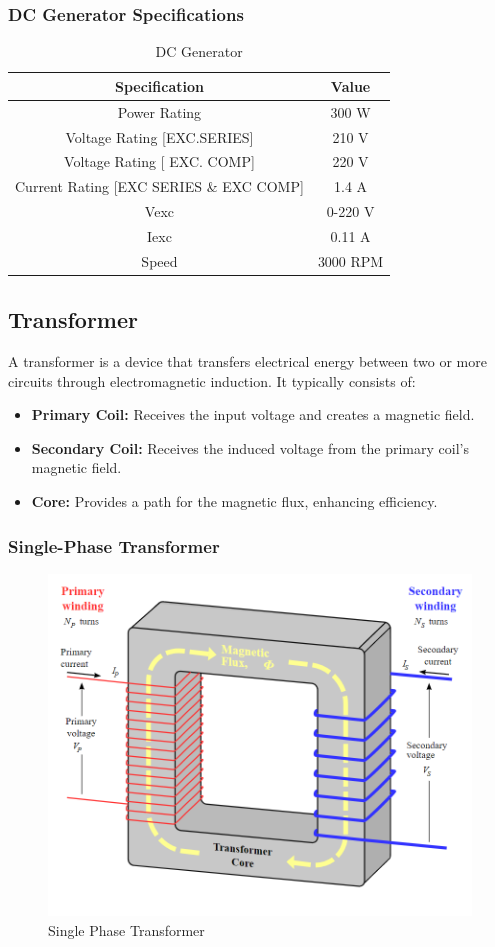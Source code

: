 \documentclass[a4paper,12pt]{article}
\begin{document}
	\subsubsection{DC Generator Specifications}
	\begin{table}[H]
		\centering
			\caption{DC Generator}
		\begin{tabular}{| c | c |}
			\hline
			\textbf{Specification} & \textbf{Value} \\ \hline
			Power Rating & 300 W\\ \hline
			Voltage Rating [EXC.SERIES] & 210 V \\ \hline
			Voltage Rating [ EXC. COMP] & 220 V \\ \hline
			Current Rating [EXC SERIES \& EXC COMP] & 1.4 A \\ \hline
			Vexc & 0-220 V \\ \hline
			Iexc & 0.11 A \\ \hline
			Speed & 3000 RPM \\ \hline
			
		\end{tabular}
	
		\label{tab:2}
	\end{table}
	
	
	
	
	
	\subsection{Transformer}
	A transformer is a device that transfers electrical energy between two or more circuits through electromagnetic induction. It typically consists of:
	\begin{itemize}
		\item \textbf{Primary Coil:} Receives the input voltage and creates a magnetic field.
		\item \textbf{Secondary Coil:} Receives the induced voltage from the primary coil’s magnetic field.
		\item \textbf{Core:} Provides a path for the magnetic flux, enhancing efficiency.
	\end{itemize}
\subsubsection{Single-Phase Transformer}
\begin{figure}[h]
	\centering
	\includegraphics[width=0.5\linewidth]{Images/T1}
	\caption[Single Phase Transformer]{Single Phase Transformer}
	\label{fig:t1}
\end{figure}
\end{document}

